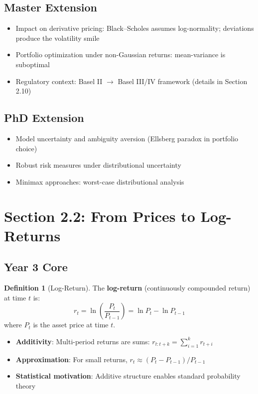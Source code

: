 \documentclass[11pt, a4paper]{article}
\theoremstyle{definition}
\newtheorem{defn}{Definition}
\begin{document}
\subsection{Master Extension}
\begin{itemize}
  \item Impact on derivative pricing: Black--Scholes assumes log-normality; deviations produce the volatility smile
  \item Portfolio optimization under non-Gaussian returns: mean-variance is suboptimal
  \item Regulatory context: Basel II $\to$ Basel III/IV framework (details in Section 2.10)
\end{itemize}

\subsection{PhD Extension}
\begin{itemize}
  \item Model uncertainty and ambiguity aversion (Ellsberg paradox in portfolio choice)
  \item Robust risk measures under distributional uncertainty
  \item Minimax approaches: worst-case distributional analysis
\end{itemize}

\section{Section 2.2: From Prices to Log-Returns}

\subsection{Year 3 Core}

\begin{defn}[Log-Return]
The \textbf{log-return} (continuously compounded return) at time $t$ is:
\[
  r_t = \ln\!\left(\frac{P_t}{P_{t-1}}\right) = \ln P_t - \ln P_{t-1}
\]
where $P_t$ is the asset price at time $t$.
\end{defn}

\begin{itemize}
  \item \textbf{Additivity}: Multi-period returns are sums: $r_{t:t+k} = \sum_{i=1}^{k} r_{t+i}$
  \item \textbf{Approximation}: For small returns, $r_t \approx (P_t - P_{t-1})/P_{t-1}$
  \item \textbf{Statistical motivation}: Additive structure enables standard probability theory
\end{itemize}
\end{document}

